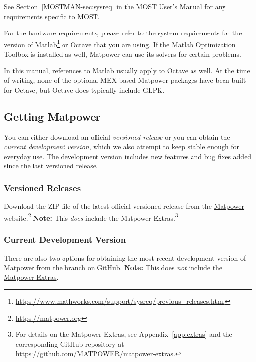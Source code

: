 \documentclass[12pt]{article}
\newcommand{\matlab}[0]{{\sc Matlab}}
\newcommand{\matpower}[0]{{\sc Matpower}}
\newcommand{\matpowerurl}[0]{https://matpower.org}
\newcommand{\matpowerextrasgithuburl}[0]{https://github.com/MATPOWER/matpower-extras}
\newcommand{\matpowerextraslink}[0]{\href{\matpowerextrasgithuburl}{\matpower{} Extras}}
\newcommand{\most}[0]{{MOST}}
\newcommand{\mostver}[0]{1.3}
\newcommand{\glpk}[0]{{GLPK}}
\newcommand{\ot}[0]{{Optimization Toolbox}}
\newcommand{\code}[1]{{\relsize{-0.5}{\tt{{#1}}}}}  %
\newcommand{\mostmanurl}[0]{https://matpower.org/docs/MOST-manual-\mostver.pdf}
\newcommand{\mostman}[0]{\href{\mostmanurl}{\most{} User's Manual}}
\numberwithin{equation}{section}
\numberwithin{table}{section}
\numberwithin{figure}{section}
\begin{document}
See Section~\ref{MOSTMAN-sec:sysreq} in the \mostman{} for any requirements specific to \most{}.

For the hardware requirements, please refer to the system requirements for the version of \matlab{}\footnote{\url{https://www.mathworks.com/support/sysreq/previous_releases.html}} or Octave that you are using. If the \matlab{} \ot{} is installed as well, \matpower{} can use its solvers for certain problems.

In this manual, references to \matlab{} usually apply to Octave as well. At the time of writing, none of the optional MEX-based \matpower{} packages have been built for Octave, but Octave does typically include \glpk{}.

\pagebreak
\subsection{Getting \matpower{}}
\label{sec:gettingmatpower}

You can either download an official \emph{versioned release} or you can obtain the \emph{current development version}, which we also attempt to keep stable enough for everyday use. The development version includes new features and bug fixes added since the last versioned release.

\subsubsection{Versioned Releases}

Download the ZIP file of the latest official versioned release from the \href{\matpowerurl}{\matpower{} website}.\footnote{\url{\matpowerurl}}
{\bf Note:} This \emph{does} include the \matpowerextraslink{}.\footnote{For details on the \matpower{} Extras, see Appendix~\ref{app:extras} and the corresponding GitHub repository at \url{\matpowerextrasgithuburl}.}

\subsubsection{Current Development Version}

There are also two options for obtaining the most recent development version
of \matpower{} from the \code{master} branch on GitHub.
{\bf Note:} This does \emph{not} include the \matpowerextraslink{}.
\end{document}
